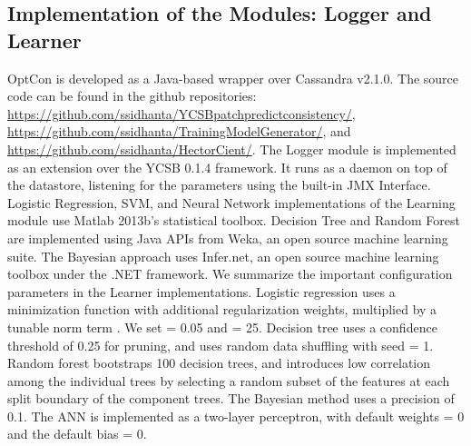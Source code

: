 \documentclass[conference]{IEEEtran}
\begin{document}
\subsection{Implementation of the Modules: Logger and Learner}\label{sec:impl}
OptCon is developed as a Java-based wrapper over Cassandra v2.1.0.  The source code can be found in the github
repositories: \url{https://github.com/ssidhanta/YCSBpatchpredictconsistency/}, \url{https://github.com/ssidhanta/TrainingModelGenerator/}, and \url{https://github.com/ssidhanta/HectorCient/}.
The Logger module is implemented as an extension over the YCSB 0.1.4 \cite{Cooper:2010:BCS:1807128.1807152} framework. It runs as a daemon on top of the datastore, listening for the parameters using the built-in JMX Interface.
Logistic Regression, SVM, and Neural Network implementations of the Learning module use Matlab 2013b's statistical toolbox. Decision Tree and Random Forest are implemented using Java APIs from Weka, an open source machine learning suite.
The Bayesian approach uses Infer.net, an open source machine learning toolbox under the .NET framework.
   We summarize the important configuration parameters in the Learner implementations. Logistic regression uses a minimization function with additional regularization weights, multiplied by a tunable  norm term . We set   = 0.05 and  = 25.
  Decision tree uses a confidence threshold  of 0.25 for pruning, and uses random data shuffling with seed = 1. Random forest  bootstraps 100 decision trees, and introduces low correlation  among the individual trees by selecting a random subset of the features at each split boundary of the component trees.  The Bayesian method uses a precision of 0.1. The ANN is implemented as a two-layer perceptron, with default weights = 0 and the  default bias = 0. 
\end{document}
